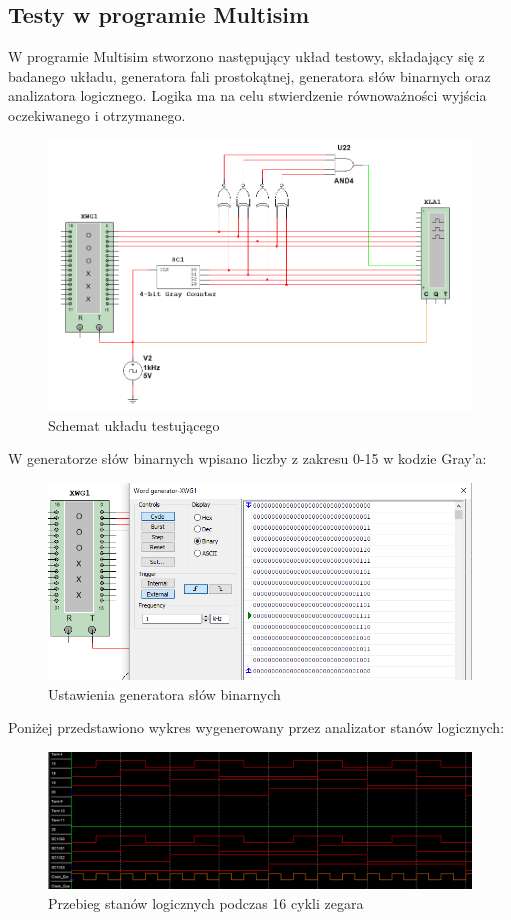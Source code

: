 \documentclass[12pt,a4paper,table]{article}
\begin{document}
    \subsection{Testy w programie Multisim}
    W programie Multisim stworzono następujący układ testowy, składający się z badanego układu, 
    generatora fali prostokątnej, generatora słów binarnych oraz analizatora logicznego. Logika
    ma na celu stwierdzenie równoważności wyjścia oczekiwanego i otrzymanego.
    \begin{figure}[h]
        \centering
        \includegraphics[width=\linewidth]{images/gray_test.PNG}
        \caption{Schemat układu testującego}
        \label{fig:gray_test}
    \end{figure}

    \pagebreak
    W generatorze słów binarnych wpisano liczby z zakresu 0-15 w kodzie Gray'a:
    \begin{figure}[h!]
        \centering
        \includegraphics[width=0.8\linewidth]{images/gray_xwb.PNG}
        \caption{Ustawienia generatora słów binarnych}
        \label{fig:gray_xwb}
    \end{figure}

    Poniżej przedstawiono wykres wygenerowany przez analizator stanów logicznych:
    \begin{figure}[h]
        \centering
        \includegraphics[width=0.9\linewidth]{images/gray_xla.PNG}
        \caption{Przebieg stanów logicznych podczas 16 cykli zegara}
        \label{fig:gray_xla}
    \end{figure}
\end{document}
